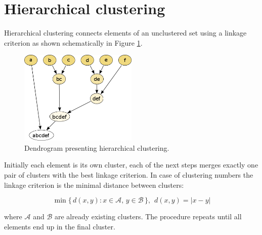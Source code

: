 
\section{Hierarchical clustering}
\label{sec:hiercluster}

Hierarchical clustering connects elements of an unclustered set using a linkage criterion
as shown schematically in Figure \ref{fig:dendrogram}.
\begin{figure}[htbp]
\centering
\includegraphics[width=0.5\textwidth]{plots/dendrogram.png}
\caption{Dendrogram presenting hierarchical clustering. \label{fig:dendrogram}}
\end{figure}

 Initially each element is its own cluster, each of the next steps merges exactly one pair of clusters 
with the best linkage criterion. In case of clustering numbers the linkage criterion is the minimal distance 
between clusters:

\[
\min \{\, d(x,y) : x \in \mathcal{A},\, y \in \mathcal{B} \,\}, \hspace{5pt} d(x,y)=|x-y| 
\]   

where $\mathcal{A}$ and $\mathcal{B}$ are already existing clusters. The procedure repeats until all elements end up
in the final cluster.   
